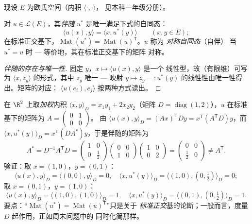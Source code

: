 现设 $E$ 为欧氏空间（内积 $\langle\cdot,\cdot\rangle$，
见本科一年级分册）。

\begin{definition}[伴随；对称自同态]\label{def:b2:quadratic:adjoint}
对 $u \in \mathcal{L}(E)$，其\emph{伴随}
$u^*$ 是唯一满足下式的自同态：
\[
\langle u(x), y\rangle = \langle x, u^*(y)\rangle
\qquad (x, y \in E);
\]
在标准正交基下，$\operatorname{Mat}(u^*) =
\operatorname{Mat}(u)^{\mathsf T}$。$u$ 称为
\emph{对称自同态}（自伴）
当 $u^* = u$ 时 --- 等价地，其在标准正交基下的矩阵
对称。
\end{definition}

\begin{proof}[伴随的存在与唯一性]
固定 $y$，$x \mapsto \langle u(x), y\rangle$ 是一个
线性型，故（有限维）可写为 $\langle x,
z_y\rangle$ 的形式，其中 $z_y$ 唯一 --- 映射 $y \mapsto z_y =:
u^*(y)$ 的线性性由唯一性得出。矩阵的对应：
$\langle u(e_i), e_j\rangle$ 按两种方式读出。
\end{proof}

\begin{example}[伴随依赖于内积]\label{ex:b2:quadratic:weightedadjoint}
在 $\R^2$ 上取\emph{加权}内积 $\langle x,
y\rangle_D = x_1y_1 + 2x_2y_2$（矩阵 $D =
\operatorname{diag}(1,2)$），$u$ 在标准基下的矩阵为 $A =
\begin{pmatrix} 0 & 1\\ 0 & 0\end{pmatrix}$。
由 $\langle u(x), y\rangle_D = (Ax)^{\mathsf T}Dy =
x^{\mathsf T}(A^{\mathsf T}D)y$，而 $\langle x, u^*(y)\rangle_D
= x^{\mathsf T}(DA^*)y$，于是伴随的矩阵为
\[
A^* = D^{-1}A^{\mathsf T}D
= \begin{pmatrix} 1 & 0\\ 0 & \tfrac12\end{pmatrix}
\begin{pmatrix} 0 & 0\\ 1 & 0\end{pmatrix}
\begin{pmatrix} 1 & 0\\ 0 & 2\end{pmatrix}
= \begin{pmatrix} 0 & 0\\ \tfrac12 & 0\end{pmatrix}
\neq A^{\mathsf T} .
\]
验证：取 $x = (1,0)$，$y = (0,1)$：
\[
\langle u(x), y\rangle_D = \langle (0,0), y\rangle_D = 0,
\quad
\langle x, u^*(y)\rangle_D
= \langle(1,0), (0,\tfrac12)\rangle_D = 0 ;
\]
取 $x = (0,1)$，$y = (1,0)$：
\[
\langle u(x), y\rangle_D = \langle(1,0),(1,0)\rangle_D = 1,
\quad
\langle x, u^*(y)\rangle_D =
\langle(0,1),(0,\tfrac12)\rangle_D = 1 .
\] 要点：“$\operatorname{Mat}(u^*)
= \operatorname{Mat}(u)^{\mathsf T}$”只是关于
\emph{标准正交}基的论断；一般而言，度量 $D$
起作用，正如周末问题中的
同时化简那样。
\end{example}


